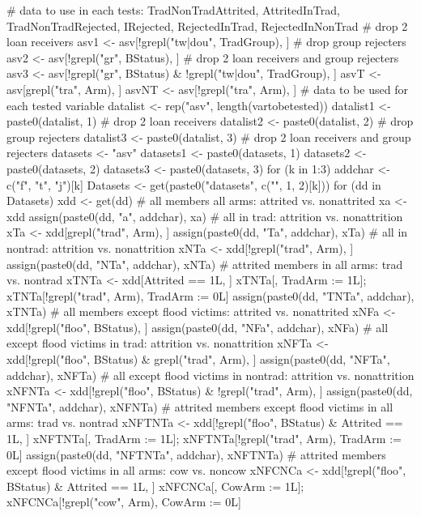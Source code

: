 \begin{Schunk}
\begin{Sinput}
# data to use in each tests: TradNonTradAttrited, AttritedInTrad, TradNonTradRejected, IRejected, RejectedInTrad, RejectedInNonTrad
# drop 2 loan receivers
asv1 <- asv[!grepl("tw|dou", TradGroup), ]
# drop group rejecters
asv2 <- asv[!grepl("gr", BStatus), ]
# drop 2 loan receivers and group rejecters
asv3 <- asv[!grepl("gr", BStatus) & !grepl("tw|dou", TradGroup), ]
asvT <- asv[grepl("tra", Arm), ]
asvNT <- asv[!grepl("tra", Arm), ]
# data to be used for each tested variable
datalist <- rep("asv", length(vartobetested))
datalist1 <- paste0(datalist, 1) # drop 2 loan receivers
datalist2 <- paste0(datalist, 2) # drop group rejecters
datalist3 <- paste0(datalist, 3) # drop 2 loan receivers and group rejecters
datasets <- "asv"
datasets1 <- paste0(datasets, 1)
datasets2 <- paste0(datasets, 2)
datasets3 <- paste0(datasets, 3)
for (k in 1:3) {
  addchar <- c("f", "t", "j")[k]
  Datasets <- get(paste0("datasets", c("", 1, 2)[k]))
  for (dd in Datasets) {
    xdd <- get(dd)
    # all members all arms: attrited vs. nonattrited
    xa <- xdd
    assign(paste0(dd, "a", addchar), xa)
    # all in trad: attrition vs. nonattrition
    xTa <- xdd[grepl("trad", Arm), ]
    assign(paste0(dd, "Ta", addchar), xTa)
    # all in nontrad: attrition vs. nonattrition
    xNTa <- xdd[!grepl("trad", Arm), ]
    assign(paste0(dd, "NTa", addchar), xNTa)
    # attrited members in all arms: trad vs. nontrad
    xTNTa <- xdd[Attrited == 1L, ]
    xTNTa[, TradArm := 1L]; xTNTa[!grepl("trad", Arm), TradArm := 0L]
    assign(paste0(dd, "TNTa", addchar), xTNTa)
    # all members except flood victims: attrited vs. nonattrited
    xNFa <- xdd[!grepl("floo", BStatus), ]
    assign(paste0(dd, "NFa", addchar), xNFa)
    # all except flood victims in trad: attrition vs. nonattrition
    xNFTa <- xdd[!grepl("floo", BStatus) & grepl("trad", Arm), ]
    assign(paste0(dd, "NFTa", addchar), xNFTa)
    # all except flood victims in nontrad: attrition vs. nonattrition
    xNFNTa <- xdd[!grepl("floo", BStatus) & !grepl("trad", Arm), ]
    assign(paste0(dd, "NFNTa", addchar), xNFNTa)
    # attrited members except flood victims in all arms: trad vs. nontrad
    xNFTNTa <- xdd[!grepl("floo", BStatus) & Attrited == 1L, ]
    xNFTNTa[, TradArm := 1L]; xNFTNTa[!grepl("trad", Arm), TradArm := 0L]
    assign(paste0(dd, "NFTNTa", addchar), xNFTNTa)
    # attrited members except flood victims in all arms: cow vs. noncow
    xNFCNCa <- xdd[!grepl("floo", BStatus) & Attrited == 1L, ]
    xNFCNCa[, CowArm := 1L]; xNFCNCa[!grepl("cow", Arm), CowArm := 0L]
}}
\end{Sinput}
\end{Schunk}
